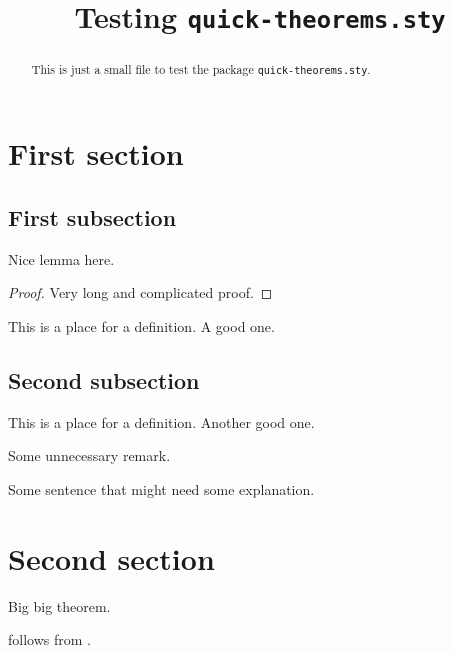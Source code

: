 \documentclass{article}
\title{Testing {\tt quick-theorems.sty}}
\begin{document}
\maketitle

\begin{abstract}
This is just a small file to test the package {\tt quick-theorems.sty}.	
\end{abstract}

\section{First section}

\subsection{First subsection}

\begin{lemma}
\label{lem:nice-lemma}
Nice lemma here.
\end{lemma}
\begin{proof}
Very long and complicated proof.	
\end{proof}

\begin{definition}[test1]
\label{def:test1}
	This is a place for a definition. A good one.
\end{definition}

\subsection{Second subsection}

\begin{definition}[test2]
	This is a place for a definition. Another good one.
\end{definition}


\begin{remark}
Some unnecessary remark.
\end{remark}
Some sentence that might need some explanation. 

\section{Second section}

\begin{theorem}
\label{thm:VIT}
Big big theorem.
\end{theorem}

 follows from .




	
\end{document}
